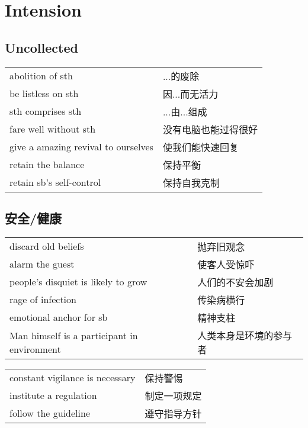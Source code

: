 \section{Intension}

\subsection{Uncollected}

\begin{tabular}{ll}
    abolition of sth                    & ...的废除     \\
    be listless on sth                  & 因...而无活力   \\
    sth comprises sth                   & ...由...组成  \\
    fare well without sth               & 没有电脑也能过得很好 \\
    give a amazing revival to ourselves & 使我们能快速回复   \\
    retain the balance                  & 保持平衡       \\
    retain sb's self-control            & 保持自我克制     \\
\end{tabular}

\subsection{安全/健康}

\begin{tabular}{ll}
    discard old beliefs                         & 抛弃旧观念       \\
    alarm the guest                             & 使客人受惊吓      \\
    people's disquiet is likely to grow         & 人们的不安会加剧    \\
    rage of infection                           & 传染病横行       \\
    emotional anchor for sb                     & 精神支柱        \\
    Man himself is a participant in environment & 人类本身是环境的参与者 \\
\end{tabular}

\begin{tabular}{ll}
    constant vigilance is necessary & 保持警惕   \\
    institute a regulation          & 制定一项规定 \\
    follow the guideline            & 遵守指导方针 \\
\end{tabular}

